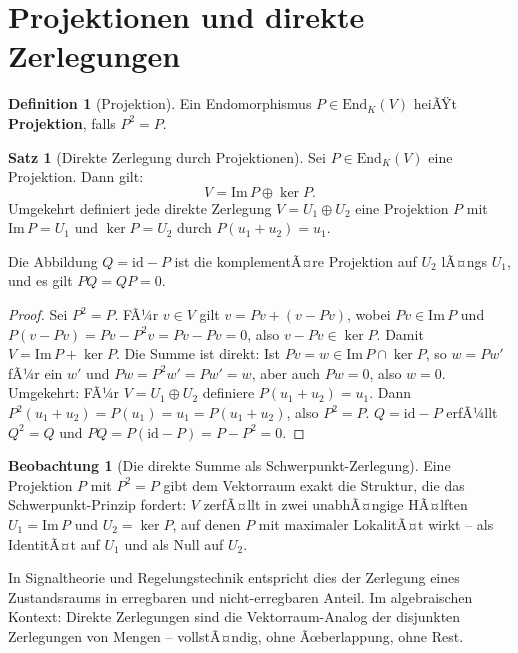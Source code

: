 ﻿\documentclass[a4paper,12pt]{report}
\theoremstyle{definition}
\newtheorem{definition}{Definition}
\newtheorem{satz}{Satz}
\newtheorem{beobachtung}{Beobachtung}
\begin{document}
\section{Projektionen und direkte Zerlegungen}

\begin{definition}[Projektion]
    Ein Endomorphismus $P \in \mathrm{End}_K(V)$ heiÃŸt
    \textbf{Projektion}, falls $P^2 = P$.
\end{definition}

\begin{satz}[Direkte Zerlegung durch Projektionen]
    Sei $P \in \mathrm{End}_K(V)$ eine Projektion. Dann gilt:
    \[
        V = \mathrm{Im}\, P \oplus \ker P.
    \]
    Umgekehrt definiert jede direkte Zerlegung $V = U_1 \oplus U_2$ eine
    Projektion $P$ mit $\mathrm{Im}\, P = U_1$ und $\ker P = U_2$ durch
    $P(u_1 + u_2) = u_1$.

    Die Abbildung $Q = \mathrm{id} - P$ ist die komplementÃ¤re Projektion
    auf $U_2$ lÃ¤ngs $U_1$, und es gilt $PQ = QP = 0$.
\end{satz}
\begin{proof}
    Sei $P^2 = P$. FÃ¼r $v \in V$ gilt $v = Pv + (v - Pv)$, wobei $Pv \in \mathrm{Im}\, P$
    und $P(v - Pv) = Pv - P^2v = Pv - Pv = 0$, also $v - Pv \in \ker P$.
    Damit $V = \mathrm{Im}\, P + \ker P$.
    Die Summe ist direkt: Ist $Pv = w \in \mathrm{Im}\, P \cap \ker P$,
    so $w = Pw' $ fÃ¼r ein $w'$ und $Pw = P^2w' = Pw' = w$, aber auch $Pw = 0$,
    also $w = 0$.
    Umgekehrt: FÃ¼r $V = U_1 \oplus U_2$ definiere $P(u_1 + u_2) = u_1$.
    Dann $P^2(u_1 + u_2) = P(u_1) = u_1 = P(u_1 + u_2)$, also $P^2 = P$.
    $Q = \mathrm{id} - P$ erfÃ¼llt $Q^2 = Q$ und $PQ = P(\mathrm{id} - P)
    = P - P^2 = 0$.
\end{proof}


\begin{beobachtung}[Die direkte Summe als Schwerpunkt-Zerlegung]
    Eine Projektion $P$ mit $P^2 = P$ gibt dem Vektorraum exakt die
    Struktur, die das Schwerpunkt-Prinzip fordert: $V$ zerfÃ¤llt in zwei
    unabhÃ¤ngige HÃ¤lften $U_1 = \mathrm{Im}\, P$ und $U_2 = \ker P$,
    auf denen $P$ mit maximaler LokalitÃ¤t wirkt -- als IdentitÃ¤t auf
    $U_1$ und als Null auf $U_2$.

    In Signaltheorie und Regelungstechnik entspricht dies der Zerlegung
    eines Zustandsraums in erregbaren und nicht-erregbaren Anteil.
    Im algebraischen Kontext: Direkte Zerlegungen sind die Vektorraum-Analog
    der disjunkten Zerlegungen von Mengen -- vollstÃ¤ndig, ohne Ãœberlappung,
    ohne Rest.
\end{beobachtung}
\end{document}
